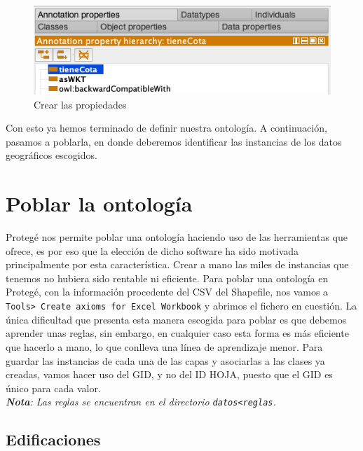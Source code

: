 \begin{figure}[H]
	\centering
	\includegraphics[width=0.75\linewidth]{imagenes/capitulo5/propiedad}
	\caption{Crear las propiedades}
	\label{fig:propiedad}
\end{figure}

Con esto ya hemos terminado de definir nuestra ontología. A continuación, pasamos a poblarla, en donde deberemos identificar las instancias de los datos geográficos escogidos.

\section{Poblar la ontología}

\label{ch:poblar}

Protegé nos permite poblar una ontología haciendo uso de las herramientas que ofrece, es por eso que la elección de dicho software ha sido motivada principalmente por esta característica. Crear a mano las miles de instancias que tenemos no hubiera sido rentable ni eficiente. Para poblar una ontología en Protegé,  con la información procedente del CSV del Shapefile, nos vamos a \texttt{Tools> Create axioms for Excel Workbook} y abrimos el fichero en cuestión. La única dificultad que presenta esta manera escogida para poblar es que debemos aprender unas reglas, sin embargo, en cualquier caso esta forma es más eficiente que hacerlo a mano, lo que conlleva una línea de aprendizaje menor. Para guardar las instancias de cada una de las capas y asociarlas a las clases ya creadas, vamos hacer uso del GID, y no del ID HOJA, puesto que el GID es único para cada valor.\\



\textit{\textbf{Nota}: Las reglas se encuentran en el directorio \texttt{datos<reglas}.}

\subsection{Edificaciones}

